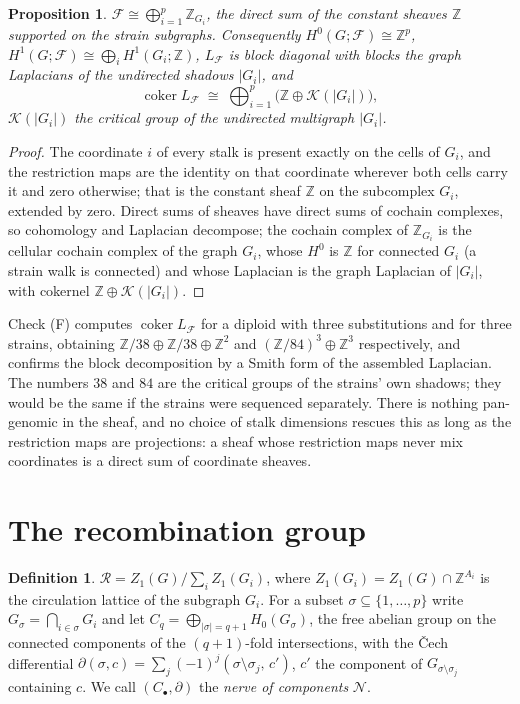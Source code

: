 \documentclass[11pt]{article}
\theoremstyle{plain}
\newtheorem{proposition}[theorem]{Proposition}
\theoremstyle{definition}
\newtheorem{definition}[theorem]{Definition}
\theoremstyle{remark}
\newcommand{\Z}{\mathbb{Z}}
\newcommand{\K}{\mathcal{K}}
\newcommand{\coker}{\operatorname{coker}}
\newcommand{\Rec}{\mathcal{R}}
\newcommand{\Nerve}{\mathcal{N}}
\newcommand{\sheaf}{\mathcal{F}}
\begin{document}
\begin{proposition}\label{prop:sheaf}
$\sheaf\cong\bigoplus_{i=1}^p\Z_{G_i}$, the direct sum of the constant sheaves $\Z$ supported
on the strain subgraphs. Consequently $H^0(G;\sheaf)\cong\Z^p$,
$H^1(G;\sheaf)\cong\bigoplus_iH^1(G_i;\Z)$, $L_\sheaf$ is block diagonal with blocks the
graph Laplacians of the undirected shadows $|G_i|$, and
\[
  \coker L_\sheaf\;\cong\;\bigoplus_{i=1}^p\big(\Z\oplus\K(|G_i|)\big),
\]
$\K(|G_i|)$ the critical group of the undirected multigraph $|G_i|$.
\end{proposition}

\begin{proof}
The coordinate $i$ of every stalk is present exactly on the cells of $G_i$, and the
restriction maps are the identity on that coordinate wherever both cells carry it and zero
otherwise; that is the constant sheaf $\Z$ on the subcomplex $G_i$, extended by zero. Direct
sums of sheaves have direct sums of cochain complexes, so cohomology and Laplacian decompose;
the cochain complex of $\Z_{G_i}$ is the cellular cochain complex of the graph $G_i$, whose
$H^0$ is $\Z$ for connected $G_i$ (a strain walk is connected) and whose Laplacian is the
graph Laplacian of $|G_i|$, with cokernel $\Z\oplus\K(|G_i|)$.
\end{proof}

Check (F) computes $\coker L_\sheaf$ for a diploid with three substitutions and for three
strains, obtaining $\Z/38\oplus\Z/38\oplus\Z^2$ and $(\Z/84)^3\oplus\Z^3$ respectively, and
confirms the block decomposition by a Smith form of the assembled Laplacian. The numbers
$38$ and $84$ are the critical groups of the strains' own shadows; they would be the same if
the strains were sequenced separately. There is nothing pan-genomic in the sheaf, and no
choice of stalk dimensions rescues this as long as the restriction maps are projections: a
sheaf whose restriction maps never mix coordinates is a direct sum of coordinate sheaves.

\section{The recombination group}\label{sec:R}

\begin{definition}
$\Rec=Z_1(G)/\sum_iZ_1(G_i)$, where $Z_1(G_i)=Z_1(G)\cap\Z^{A_i}$ is the circulation
lattice of the subgraph $G_i$. For a subset $\sigma\subseteq\{1,\dots,p\}$ write
$G_\sigma=\bigcap_{i\in\sigma}G_i$ and let $C_q=\bigoplus_{|\sigma|=q+1}H_0(G_\sigma)$, the
free abelian group on the connected components of the $(q{+}1)$-fold intersections, with the
\v Cech differential $\partial(\sigma,c)=\sum_j(-1)^j(\sigma\setminus\sigma_j,\,c')$, $c'$
the component of $G_{\sigma\setminus\sigma_j}$ containing $c$. We call $(C_\bullet,\partial)$
the \emph{nerve of components} $\Nerve$.
\end{definition}
\end{document}
